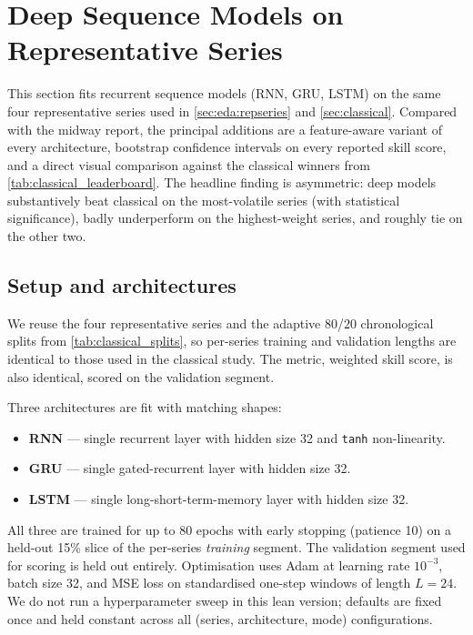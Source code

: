 \section{Deep Sequence Models on Representative Series}
\label{sec:deep}

This section fits recurrent sequence models (RNN, GRU, LSTM) on the same four representative series used in \cref{sec:eda:repseries} and \cref{sec:classical}. Compared with the midway report, the principal additions are a feature-aware variant of every architecture, bootstrap confidence intervals on every reported skill score, and a direct visual comparison against the classical winners from \cref{tab:classical_leaderboard}. The headline finding is asymmetric: deep models substantively beat classical on the most-volatile series (with statistical significance), badly underperform on the highest-weight series, and roughly tie on the other two.

\subsection{Setup and architectures}
\label{sec:deep:setup}

We reuse the four representative series and the adaptive 80/20 chronological splits from \cref{tab:classical_splits}, so per-series training and validation lengths are identical to those used in the classical study. The metric, weighted skill score, is also identical, scored on the validation segment.

Three architectures are fit with matching shapes:

\begin{itemize}
  \item \textbf{RNN} --- single recurrent layer with hidden size 32 and \texttt{tanh} non-linearity.
  \item \textbf{GRU} --- single gated-recurrent layer with hidden size 32.
  \item \textbf{LSTM} --- single long-short-term-memory layer with hidden size 32.
\end{itemize}

All three are trained for up to 80 epochs with early stopping (patience 10) on a held-out 15\% slice of the per-series \emph{training} segment. The validation segment used for scoring is held out entirely. Optimisation uses Adam at learning rate $10^{-3}$, batch size 32, and MSE loss on standardised one-step windows of length $L = 24$. We do not run a hyperparameter sweep in this lean version; defaults are fixed once and held constant across all (series, architecture, mode) configurations.

